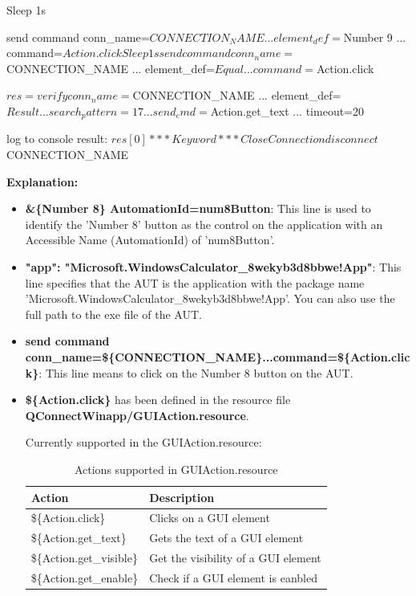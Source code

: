 \begin{robotcode}
    Sleep    1s

    send command        conn_name=${CONNECTION_NAME}
    ...                 element_def=${Number 9}
    ...                 command=${Action.click}

    Sleep    1s

    send command        conn_name=${CONNECTION_NAME}
    ...                 element_def=${Equal}
    ...                 command=${Action.click}

    ${res}=     verify     conn_name=${CONNECTION_NAME}
    ...                    element_def=${Result}
    ...                    search_pattern=17
    ...                    send_cmd=${Action.get_text}
    ...                    timeout=20

    log to console  \nCalculation result: ${res}[0]


*** Keyword ***
Close Connection
    disconnect  ${CONNECTION_NAME}
\end{robotcode}

\textbf{Explanation:}
\begin{itemize}
\item \colorbox{gray!16}{\textbf{\&\{Number 8\} AutomationId=num8Button}}: This line is used to identify the 'Number 8' button as the control on the application with an Accessible Name (AutomationId) of 'num8Button'.
\item \colorbox{gray!16}{\textbf{"app": "Microsoft.WindowsCalculator\_8wekyb3d8bbwe!App"}}: This line specifies that the AUT is the application with the package name 'Microsoft.WindowsCalculator\_8wekyb3d8bbwe!App'. You can also use the full path to the exe file of the AUT.
\item \colorbox{gray!16}{\textbf{send command conn\_name=\$\{CONNECTION\_NAME\}...command=\$\{Action.click\}}}: This line means to click on the Number 8 button on the AUT.
\item \colorbox{gray!16}{\textbf{\$\{Action.click\}}} has been defined in the resource file \colorbox{gray!16}{\textbf{QConnectWinapp/GUIAction.resource}}.

Currently supported in the GUIAction.resource:
\begin{table}[h]
    \centering
    \begin{tabular}{|l|l|}
        \hline
        \textbf{Action} & \textbf{Description} \\ \hline
        \$\{Action.click\} & Clicks on a GUI element \\ \hline
        \$\{Action.get\_text\} & Gets the text of a GUI element \\ \hline
        \$\{Action.get\_visible\} & Get the visibility of a GUI element \\ \hline
        \$\{Action.get\_enable\} & Check if a GUI element is eanbled \\ \hline
    \end{tabular}
    \caption{Actions supported in GUIAction.resource}
    \label{tab:actions}
\end{table}


\end{itemize}


